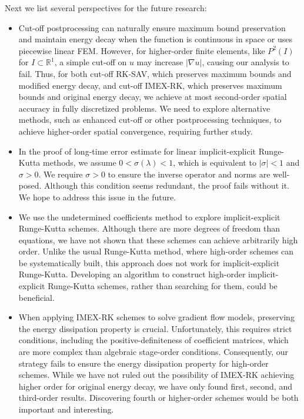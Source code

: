\documentclass[a4paper, oneside]{book}
\begin{document}
Next we list several perspectives for the future research:
\begin{itemize}
    \item[1.] Cut-off postprocessing can naturally ensure maximum bound preservation and maintain energy decay when the function is continuous in space or uses piecewise linear FEM. However, for higher-order finite elements, like $P^2(I)$ for $I \subset \mathbb{R}^1$, a simple cut-off on $u$ may increase $|\nabla u|$, causing our analysis to fail. Thus, for both cut-off RK-SAV, which preserves maximum bounds and modified energy decay, and cut-off IMEX-RK, which preserves maximum bounds and original energy decay, we achieve at most second-order spatial accuracy in fully discretized problems. We need to explore alternative methods, such as enhanced cut-off or other postprocessing techniques, to achieve higher-order spatial convergence, requiring further study.
    \item[2.] In the proof of long-time error estimate for linear implicit-explicit Runge-Kutta methods, we assume $0 < \sigma(\lambda) < 1$, which is equivalent to $|\sigma| < 1$ and $\sigma > 0$. We require $\sigma > 0$ to ensure the inverse operator and norms are well-posed. Although this condition seems redundant, the proof fails without it. We hope to address this issue in the future.
    \item[3.] We use the undetermined coefficients method to explore implicit-explicit Runge-Kutta schemes. Although there are more degrees of freedom than equations, we have not shown that these schemes can achieve arbitrarily high order. Unlike the usual Runge-Kutta method, where high-order schemes can be systematically built, this approach does not work for implicit-explicit Runge-Kutta. Developing an algorithm to construct high-order implicit-explicit Runge-Kutta schemes, rather than searching for them, could be beneficial.
    \item[4.] When applying IMEX-RK schemes to solve gradient flow models, preserving the energy dissipation property is crucial. Unfortunately, this requires strict conditions, including the positive-definiteness of coefficient matrices, which are more complex than algebraic stage-order conditions. Consequently, our strategy fails to ensure the energy dissipation property for high-order schemes. While we have not ruled out the possibility of IMEX-RK achieving higher order for original energy decay, we have only found first, second, and third-order results. Discovering fourth or higher-order schemes would be both important and interesting.

\end{itemize}
\end{document}

